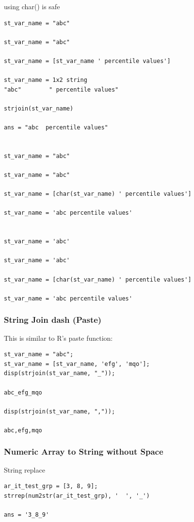 \documentclass[
]{book}
\begin{document}
using char() is safe

\begin{verbatim}
st_var_name = "abc"

st_var_name = "abc"

st_var_name = [st_var_name ' percentile values']

st_var_name = 1x2 string    
"abc"        " percentile values"    

strjoin(st_var_name)

ans = "abc  percentile values"


st_var_name = "abc"

st_var_name = "abc"

st_var_name = [char(st_var_name) ' percentile values']

st_var_name = 'abc percentile values'


st_var_name = 'abc'

st_var_name = 'abc'

st_var_name = [char(st_var_name) ' percentile values']

st_var_name = 'abc percentile values'
\end{verbatim}

\hypertarget{string-join-dash-paste}{%
\subsubsection{String Join dash (Paste)}\label{string-join-dash-paste}}

This is similar to R's paste function:

\begin{verbatim}
st_var_name = "abc";
st_var_name = [st_var_name, 'efg', 'mqo'];
disp(strjoin(st_var_name, "_"));

abc_efg_mqo

disp(strjoin(st_var_name, ","));

abc,efg,mqo
\end{verbatim}

\hypertarget{numeric-array-to-string-without-space}{%
\subsubsection{Numeric Array to String without Space}\label{numeric-array-to-string-without-space}}

String replace

\begin{verbatim}
ar_it_test_grp = [3, 8, 9];
strrep(num2str(ar_it_test_grp), '  ', '_')

ans = '3_8_9'
\end{verbatim}
\end{document}
